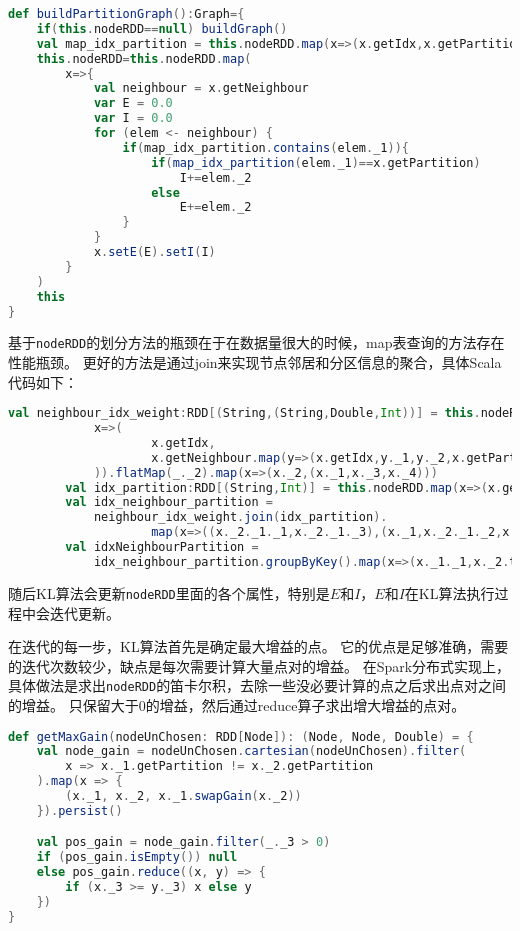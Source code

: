 \begin{lstlisting}[language=Scala]
def buildPartitionGraph():Graph={
    if(this.nodeRDD==null) buildGraph()
    val map_idx_partition = this.nodeRDD.map(x=>(x.getIdx,x.getPartition)).collectAsMap()
    this.nodeRDD=this.nodeRDD.map(
        x=>{
            val neighbour = x.getNeighbour
            var E = 0.0
            var I = 0.0
            for (elem <- neighbour) {
                if(map_idx_partition.contains(elem._1)){
                    if(map_idx_partition(elem._1)==x.getPartition)
                        I+=elem._2
                    else
                        E+=elem._2
                }
            }
            x.setE(E).setI(I)
        }
    )
    this
}
\end{lstlisting}
基于\texttt{nodeRDD}的划分方法的瓶颈在于在数据量很大的时候，map表查询的方法存在性能瓶颈。
更好的方法是通过join来实现节点邻居和分区信息的聚合，具体Scala代码如下：
\begin{lstlisting}[language=Scala]
val neighbour_idx_weight:RDD[(String,(String,Double,Int))] = this.nodeRDD.map(
            x=>(
                    x.getIdx,
                    x.getNeighbour.map(y=>(x.getIdx,y._1,y._2,x.getPartition)),
            )).flatMap(_._2).map(x=>(x._2,(x._1,x._3,x._4)))
        val idx_partition:RDD[(String,Int)] = this.nodeRDD.map(x=>(x.getIdx,x.getPartition))
        val idx_neighbour_partition =
            neighbour_idx_weight.join(idx_partition).
                    map(x=>((x._2._1._1,x._2._1._3),(x._1,x._2._1._2,x._2._2)))
        val idxNeighbourPartition =
            idx_neighbour_partition.groupByKey().map(x=>(x._1._1,x._2.toList,x._1._2))
\end{lstlisting}
随后KL算法会更新\texttt{nodeRDD}里面的各个属性，特别是$E$和$I$，$E$和$I$在KL算法执行过程中会迭代更新。

在迭代的每一步，KL算法首先是确定最大增益的点。
它的优点是足够准确，需要的迭代次数较少，缺点是每次需要计算大量点对的增益。
在Spark分布式实现上，具体做法是求出\texttt{nodeRDD}的笛卡尔积，去除一些没必要计算的点之后求出点对之间的增益。
只保留大于$0$的增益，然后通过reduce算子求出增大增益的点对。

\begin{lstlisting}[language=Scala]
def getMaxGain(nodeUnChosen: RDD[Node]): (Node, Node, Double) = {
    val node_gain = nodeUnChosen.cartesian(nodeUnChosen).filter(
        x => x._1.getPartition != x._2.getPartition
    ).map(x => {
        (x._1, x._2, x._1.swapGain(x._2))
    }).persist()

    val pos_gain = node_gain.filter(_._3 > 0)
    if (pos_gain.isEmpty()) null
    else pos_gain.reduce((x, y) => {
        if (x._3 >= y._3) x else y
    })
}
\end{lstlisting}

